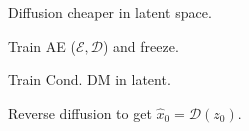 
\begin{definition}
    Diffusion cheaper in latent space.
    \begin{enumerate*}
        \item Train AE (\(\mathcal{E}, \mathcal{D}\)) and freeze.
        \item Train Cond. DM in latent.
        \item Reverse diffusion to get \(\hat x_0 = \mathcal{D}(z_0)\).
    \end{enumerate*}
\end{definition}

